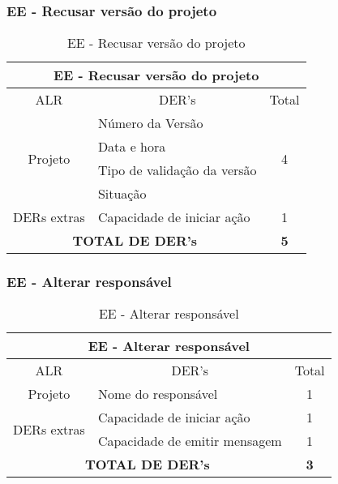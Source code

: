    \subsubsection{EE - Recusar versão do projeto}
   
      \begin{table}[!h]
      \centering
      \caption{EE - Recusar versão do projeto}
      \label{ee_resusar_versao_projeto}
      \begin{tabular}{|c|l|c|}
      \hline
      \multicolumn{3}{|c|}{EE - Recusar versão do projeto}                        \\ \hline
      ALR                      & \multicolumn{1}{c|}{DER's}  & Total              \\ \hline
      \multirow{4}{*}{Projeto} & Número da Versão            & \multirow{4}{*}{4} \\ \cline{2-2}
			      & Data e hora                 &                    \\ \cline{2-2}
			      & Tipo de validação da versão &                    \\ \cline{2-2}
			      & Situação                    &                    \\ \hline
      DERs extras              & Capacidade de iniciar ação  & 1                  \\ \hline
      \multicolumn{2}{|c|}{\textbf{TOTAL DE DER's}}          & \textbf{5}         \\ \hline
      \end{tabular}
      \end{table}
      
   
\vfill
\pagebreak   
      
   \subsubsection{EE - Alterar responsável}
      
      \begin{table}[!h]
      \centering
      \caption{EE - Alterar responsável}
      \label{ee_alterar_responsavel}
      \begin{tabular}{|c|l|c|}
      \hline
      \multicolumn{3}{|c|}{EE - Alterar responsável}                              \\ \hline
      ALR                          & \multicolumn{1}{c|}{DER's}    & Total        \\ \hline
      Projeto                      & Nome do responsável           & 1            \\ \hline
      \multirow{2}{*}{DERs extras} & Capacidade de iniciar ação    & 1            \\ \cline{2-3} 
				  & Capacidade de emitir mensagem & 1            \\ \hline
       \multicolumn{2}{|c|}{\textbf{TOTAL DE DER's}}          & \textbf{3}         \\ \hline
      \end{tabular}
      \end{table}
      

